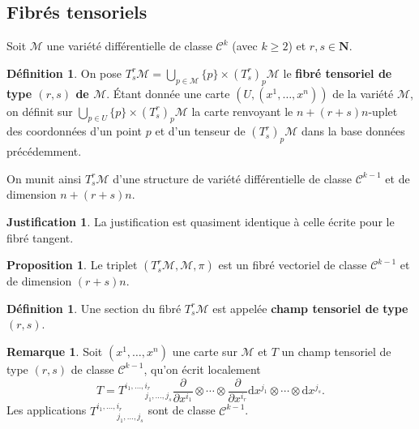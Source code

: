\documentclass[12pt,a4paper]{article}
\theoremstyle{definition}
\newtheorem{prop}[thm]{Proposition}
\newtheorem{defn}[thm]{Définition}
\newtheorem{rqe}[thm]{Remarque}
\newtheorem*{just}{Justification}
\begin{document}
\subsection{Fibrés tensoriels}
Soit $\mathcal{M}$ une variété différentielle de classe $\mathcal{C}^k$ (avec $k\geqslant 2$) et $r,s\in\mathbf{N}$.
\begin{defn}
On pose $\displaystyle T^r_s\mathcal{M}=\bigcup_{p\in\mathcal{M}}\{p\}\times (T^r_s)_p\mathcal{M}$ le \textbf{fibré tensoriel de type $(r,s)$ de $\mathcal{M}$}.\newline
Étant donnée une carte $(U,(x^1,\ldots,x^n))$ de la variété $\mathcal{M}$, on définit sur $\displaystyle\bigcup_{p\in U}\{p\}\times (T^r_s)_p\mathcal{M}$ la carte renvoyant le $n+(r+s)n$-uplet des coordonnées d'un point $p$ et d'un tenseur de $(T^r_s)_p\mathcal{M}$ dans la base données précédemment.\newline

On munit ainsi $T^r_s\mathcal{M}$ d'une structure de variété différentielle de classe $\mathcal{C}^{k-1}$ et de dimension $n+(r+s)n$.
\end{defn}
\begin{just}
La justification est quasiment identique à celle écrite pour le fibré tangent.
\end{just}
\begin{prop}
Le triplet $(T^r_s\mathcal{M},\mathcal{M},\pi)$ est un fibré vectoriel de classe $\mathcal{C}^{k-1}$ et de dimension $(r+s)n$.
\end{prop}
\begin{defn}
Une section du fibré $T^r_s\mathcal{M}$ est appelée \textbf{champ tensoriel de type $(r,s)$}.
\end{defn}
\begin{rqe}
Soit $(x^1,\ldots,x^n)$ une carte sur $\mathcal{M}$ et $T$ un champ tensoriel de type $(r,s)$ de classe $\mathcal{C}^{k-1}$, qu'on écrit localement
$$T=T_{\;\;\qquad j_1,\ldots,j_s}^{i_1,\ldots,i_r}\dfrac{\partial}{\partial x^{i_1}}\otimes\cdots\otimes\dfrac{\partial}{\partial x^{i_r}}\mathrm{d}x^{j_1}\otimes\cdots\otimes\mathrm{d}x^{j_s}.$$
Les applications $T_{\;\;\qquad j_1,\ldots,j_s}^{i_1,\ldots,i_r}$ sont de classe $\mathcal{C}^{k-1}$.
\end{rqe}
\end{document}
